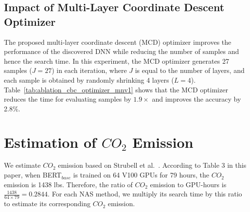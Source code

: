\subsection{Impact of Multi-Layer Coordinate Descent Optimizer}

The proposed multi-layer coordinate descent (MCD) optimizer improves the performance of the discovered DNN while reducing the number of samples and hence the search time. In this experiment, the MCD optimizer generates 27 samples ($J=27$) in each iteration, where $J$ is equal to the number of layers, and each sample is obtained by randomly shrinking 4 layers ($L=4$). Table~\ref{tab:ablation_cbc_optimizer_mnv1} shows that the MCD optimizer reduces the time for evaluating samples by $1.9\times$ and improves the accuracy by 2.8\%.


\section{Estimation of $CO_2$ Emission}
We estimate $CO_2$ emission based on Strubell et al.~\cite{strubell_2019_energy}. According to Table 3 in this paper, when BERT$_{base}$ is trained on 64 V100 GPUs for 79 hours, the $CO_2$ emission is 1438 lbs. Therefore, the ratio of $CO_2$ emission to GPU-hours is $\frac{1438}{64 \times 79} = 0.2844$. For each NAS method, we multiply its search time by this ratio to estimate its corresponding $CO_2$ emission.